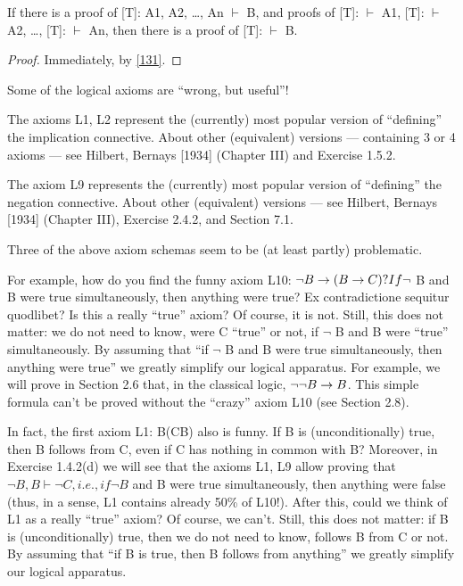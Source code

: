 \begin{corollary}
If there is a proof of [T]: A1, A2, \ldots , An \(\vdash\) B, and proofs of [T]: \(\vdash\) A1, [T]: \(\vdash\) A2, \ldots , [T]: \(\vdash\)
An, then there is a proof of [T]: \(\vdash\) B.
\end{corollary}
\begin{proof}
Immediately, by \cref{131}.
\end{proof}

Some of the logical axioms are ``wrong, but useful''!

The axioms L1, L2 represent the (currently) most popular version of ``defining'' the implication connective. About other (equivalent) versions --- containing 3 or 4 axioms --- see Hilbert, Bernays [1934] (Chapter III) and Exercise 1.5.2.

The axiom L9 represents the (currently) most popular version of ``defining'' the negation connective.
About other (equivalent) versions --- see Hilbert, Bernays [1934] (Chapter III), Exercise 2.4.2, and Section 7.1.

Three of the above axiom schemas seem to be (at least partly) problematic.

For example, how do you find the funny axiom L10: \(\neg B\rightarrow (B\rightarrow C)? If \neg\) B and B were true simultaneously, then anything were true? Ex contradictione sequitur quodlibet? Is this a really ``true'' axiom? Of course, it is not. Still, this does not matter: we do not need to know, were C ``true'' or not, if \(\neg\) B and B were ``true'' simultaneously. By assuming that ``if \(\neg\) B and B were true simultaneously, then anything were true'' we greatly simplify our logical apparatus. For example, we will prove in Section 2.6 that, in the classical logic, \(\neg \neg B\rightarrow B\). This simple formula can't be proved without the ``crazy'' axiom L10 (see Section 2.8).

In fact, the first axiom L1: B\IMPLIES (C\IMPLIES B) also is funny. If B is (unconditionally) true, then B follows from C, even if C has nothing in common with B? Moreover, in Exercise 1.4.2(d) we will see that the axioms L1, L9 allow proving that \(\neg B, B \vdash \neg C, i.e., if \neg B\) and B were true simultaneously, then anything were false (thus, in a sense, L1 contains already 50\% of L10!). After this, could we think of L1 as a really ``true'' axiom? Of course, we can't. Still, this does not matter: if B is (unconditionally) true, then we do not need to know, follows B from C or not. By assuming that ``if B is true, then B follows from anything'' we greatly simplify our logical apparatus.

